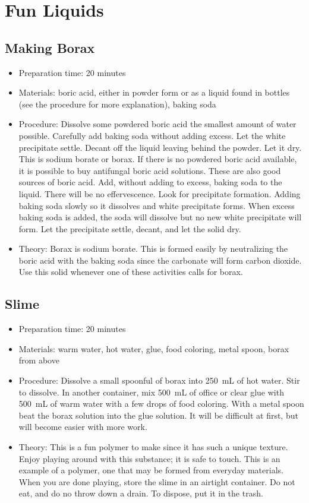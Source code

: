 \section{Fun Liquids}

\subsection{Making Borax}
\begin{itemize}
\item{Preparation time: 20 minutes}
\item{Materials: boric acid, either in powder form or as a liquid found in bottles (see the procedure for more explanation), baking soda}
\item{Procedure: Dissolve some powdered boric acid the smallest amount of water possible. Carefully add baking soda without adding excess. Let the white precipitate settle. Decant off the liquid leaving behind the powder. Let it dry. This is sodium borate or borax. If there is no powdered boric acid available, it is possible to buy antifungal boric acid solutions. These are also good sources of boric acid. Add, without adding to excess, baking soda to the liquid. There will be no effervescence. Look for precipitate formation. Adding baking soda slowly so it dissolves and white precipitate forms. When excess baking soda is added, the soda will dissolve but no new white precipitate will form. Let the precipitate settle, decant, and let the solid dry.}
\item{Theory: Borax is sodium borate. This is formed easily by neutralizing the boric acid with the baking soda since the carbonate will form carbon dioxide. Use this solid whenever one of these activities calls for borax.}
\end{itemize}

\subsection{Slime}
\begin{itemize}
\item{Preparation time: 20 minutes}
\item{Materials: warm water, hot water, glue, food coloring, metal spoon, borax from above}
\item{Procedure: Dissolve a small spoonful of borax into 250~mL of hot water. Stir to dissolve. In another container, mix 500~mL of office or clear glue with 500~mL of warm water with a few drops of food coloring. With a metal spoon beat the borax solution into the glue solution. It will be difficult at first, but will become easier with more work.}
\item{Theory: This is a fun polymer to make since it has such a unique texture. Enjoy playing around with this substance; it is safe to touch. This is an example of a polymer, one that may be formed from everyday materials. When you are done playing, store the slime in an airtight container. Do not eat, and do no throw down a drain. To dispose, put it in the trash.}
\end{itemize}

